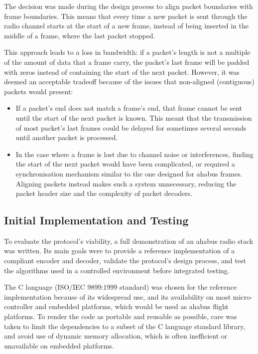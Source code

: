 
The decision was made during the design process to align packet boundaries with
frame boundaries. This means that every time a new packet is sent through the
radio channel starts at the start of a new frame, instead of being inserted
in the middle of a frame, where the last packet stopped.

This approach leads to a loss in bandwidth: if a packet's length is not a 
multiple of the amount of data that a frame carry, the packet's last frame
will be padded with zeros instead of containing the start of the next packet.
However, it was deemed an acceptable tradeoff because of the issues that
non-aligned (contiguous) packets would present:

\begin{itemize}
\item If a packet's end does not match a frame's end, that frame cannot be
sent until the start of the next packet is known. This meant that the
transmission of most packet's last frames could be delayed for sometimes several
seconds until another packet is processed.

\item In the case where a frame is lost due to channel noise or interferences,
finding the start of the next packet would have been complicated, or required
a synchronisation mechanism similar to the one designed for \acrshort{ahabus} frames.
Aligning packets instead makes such a system unnecessary, reducing the packet
header size and the complexity of packet decoders.
\end{itemize}


\subsection{Initial Implementation and Testing}

To evaluate the protocol's viability, a full demonstration of an \acrshort{ahabus} radio
stack was written. Its main goals were to provide a reference implementation of
a compliant encoder and decoder, validate the protocol's design process, and
test the algorithms used in a controlled environment before integrated testing.

The C language (ISO/IEC 9899:1999 standard) was chosen for the reference
implementation because of its widespread use, and its availability on most
micro-controller and embedded platforms, which would be used as \acrshort{ahabus} flight
platforms. To render the code as portable and reusable as possible, care was
taken to limit the dependencies to a subset of the C language standard library,
and avoid use of dynamic memory allocation, which is often inefficient or
unavailable on embedded platforms.

